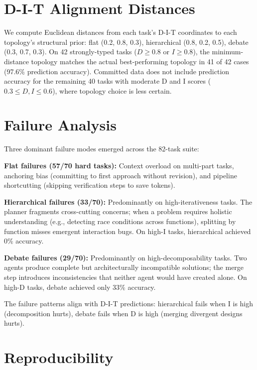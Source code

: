 \section{D-I-T Alignment Distances}\label{app:dit-distances}

We compute Euclidean distances from each task's D-I-T coordinates to each topology's structural prior: flat (0.2, 0.8, 0.3), hierarchical (0.8, 0.2, 0.5), debate (0.3, 0.7, 0.3). On 42 strongly-typed tasks ($D \geq 0.8$ or $I \geq 0.8$), the minimum-distance topology matches the actual best-performing topology in 41 of 42 cases (97.6\% prediction accuracy). Committed data does not include prediction accuracy for the remaining 40 tasks with moderate D and I scores ($0.3 \leq D, I \leq 0.6$), where topology choice is less certain.

\section{Failure Analysis}\label{appendix:failure-analysis}

Three dominant failure modes emerged across the 82-task suite:

\textbf{Flat failures (57/70 hard tasks):} Context overload on multi-part tasks, anchoring bias (committing to first approach without revision), and pipeline shortcutting (skipping verification steps to save tokens).

\textbf{Hierarchical failures (33/70):} Predominantly on high-iterativeness tasks. The planner fragments cross-cutting concerns; when a problem requires holistic understanding (e.g., detecting race conditions across functions), splitting by function misses emergent interaction bugs. On high-I tasks, hierarchical achieved 0\% accuracy.

\textbf{Debate failures (29/70):} Predominantly on high-decomposability tasks. Two agents produce complete but architecturally incompatible solutions; the merge step introduces inconsistencies that neither agent would have created alone. On high-D tasks, debate achieved only 33\% accuracy.

The failure patterns align with D-I-T predictions: hierarchical fails when I is high (decomposition hurts), debate fails when D is high (merging divergent designs hurts).

\section{Reproducibility}\label{app:reproducibility}

